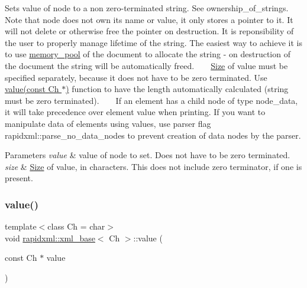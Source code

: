 Sets value of node to a non zero-\/terminated string. See ownership\+\_\+of\+\_\+strings. ~\newline
~\newline
 Note that node does not own its name or value, it only stores a pointer to it. It will not delete or otherwise free the pointer on destruction. It is reponsibility of the user to properly manage lifetime of the string. The easiest way to achieve it is to use \hyperlink{classrapidxml_1_1memory__pool}{memory\+\_\+pool} of the document to allocate the string -\/ on destruction of the document the string will be automatically freed. ~\newline
~\newline
 \hyperlink{classSize}{Size} of value must be specified separately, because it does not have to be zero terminated. Use \hyperlink{classrapidxml_1_1xml__base_a81e63ec4bfd2d7ef0a6c2ed49be6e623}{value(const Ch $\ast$)} function to have the length automatically calculated (string must be zero terminated). ~\newline
~\newline
 If an element has a child node of type node\+\_\+data, it will take precedence over element value when printing. If you want to manipulate data of elements using values, use parser flag rapidxml\+::parse\+\_\+no\+\_\+data\+\_\+nodes to prevent creation of data nodes by the parser. 
\begin{DoxyParams}{Parameters}
{\em value} & value of node to set. Does not have to be zero terminated. \\
\hline
{\em size} & \hyperlink{classSize}{Size} of value, in characters. This does not include zero terminator, if one is present. \\
\hline
\end{DoxyParams}
\mbox{\label{classrapidxml_1_1xml__base_a81e63ec4bfd2d7ef0a6c2ed49be6e623}} 
\subsubsection{\texorpdfstring{value()}{value()}\hspace{0.1cm}{\footnotesize\ttfamily [3/3]}}
{\footnotesize\ttfamily template$<$class Ch  = char$>$ \\
void \hyperlink{classrapidxml_1_1xml__base}{rapidxml\+::xml\+\_\+base}$<$ Ch $>$\+::value (\begin{DoxyParamCaption}\item[{const Ch $\ast$}]{value }\end{DoxyParamCaption})\hspace{0.3cm}{\ttfamily [inline]}}

